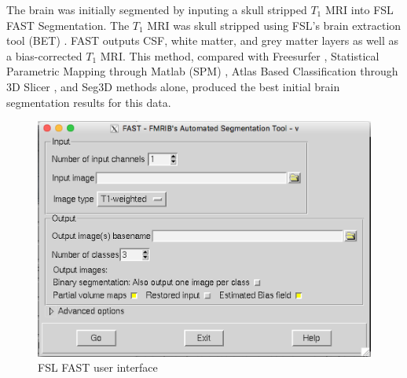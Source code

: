 The brain was initially segmented by inputing a skull stripped $T_1$ MRI into FSL FAST Segmentation. The $T_1$ MRI was skull stripped using FSL's brain extraction tool (BET) \cite{ref:bet1}. FAST outputs CSF, white matter, and grey matter layers as well as a bias-corrected $T_1$ MRI. This method, compared with Freesurfer \cite{ref:freesurf}, Statistical Parametric Mapping through Matlab (SPM) \cite{ref:spm}, Atlas Based Classification through 3D Slicer \cite{ref:abc}, and Seg3D methods alone, produced the best initial brain segmentation results for this data. 
\begin{figure}[H]
    \centering
    \includegraphics[width=.8\textwidth]{Figures/FSL_FAST}
    \caption{FSL FAST user interface}
    \label{fig:fslfast}
\end{figure}

